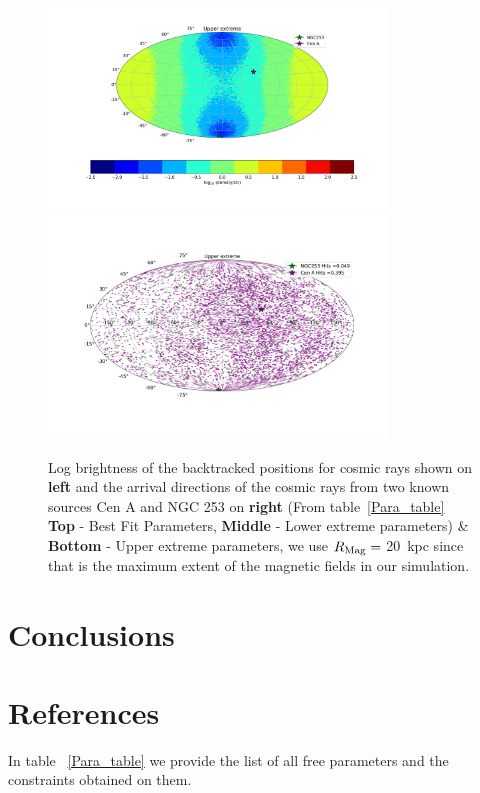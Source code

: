 \documentclass[12pt, a4 paper]{article}
\begin{document}
\begin{figure}[h]
\includegraphics[width=9.0cm]{Images/Log_Bins_180_Historgam_UB_N2_Str_Tur_TM_40_EeV.png}
\includegraphics[width=9.0cm]{Images/Bins_180_UB_N2_CenA_NGC253_Str_Tur_TM_40_EeV.png}
\caption{Log brightness of the backtracked positions for cosmic rays shown on \textbf{left} and the arrival directions of the cosmic rays from two known sources Cen A and NGC 253 on \textbf{right} (From table~\ref{Para_table} \textbf{Top} - Best Fit Parameters, {\textbf{Middle} - Lower extreme parameters)} \& {\textbf{Bottom} - Upper extreme parameters, we use $R_{\rm Mag} = $ 20~kpc since that is the maximum extent of the magnetic fields in our simulation.}}
\label{fig:AD_Plots}
\end{figure}
\newpage
\section{Conclusions}
\label{Conclusions}

\clearpage
\section{References}

\printbibliography[heading=none]

\nocite{*}

In table ~\ref{Para_table} we provide the list of all free parameters and the constraints obtained on them.
\newline
\end{document}
